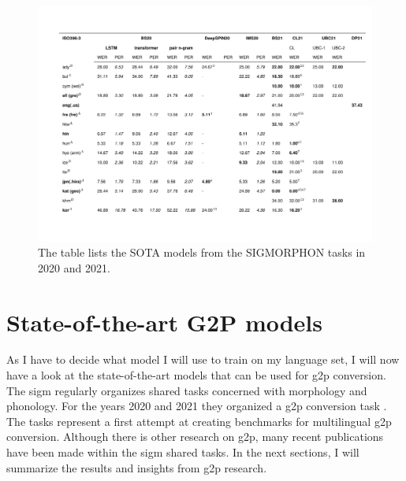 \begin{landscape}
\begin{figure}[h]
  \thispagestyle{empty}
\vspace*{-2.8cm}
    \begin{center}
    \hspace*{-2cm}
      \includegraphics[page=2,width=1.1\linewidth]{SOTA.pdf}
    \end{center}
    \vspace*{-1.5cm}
    \caption[State-of-the-art models]{The table lists the SOTA models from the SIGMORPHON tasks in 2020 and 2021.}
    \label{fig:sota_table_long}
  \end{figure}
 \end{landscape}
 
\section{State-of-the-art G2P models}
\label{section:sig}
As I have to decide what model I will use to train on my language set, I will now have a look at the state-of-the-art models that can be used for \ac{g2p} conversion.  
The \ac{sigm} \citep{Sigmorphon.2021} regularly organizes shared tasks concerned with morphology and phonology. For the years 2020 and 2021 they organized a \ac{g2p} conversion task \citep{Ashby&Bartley.2021, gorman-etal-2020-sigmorphon}. The tasks represent a first attempt at creating benchmarks for multilingual \ac{g2p} conversion. Although there is other research on \ac{g2p}, many recent publications have been made within the \ac{sigm} shared tasks. 
In the next sections, I will summarize the results and insights from \ac{g2p} research.


